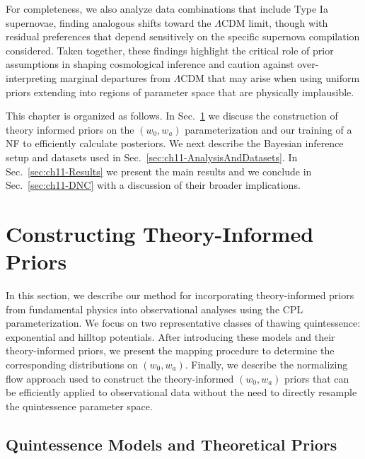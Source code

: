 For completeness, we also analyze data combinations that include Type Ia supernovae, finding analogous shifts toward the $\Lambda$CDM limit, though with residual preferences that depend sensitively on the specific supernova compilation considered. Taken together, these findings highlight the critical role of prior assumptions in shaping cosmological inference and caution against over-interpreting marginal departures from $\Lambda$CDM that may arise when using uniform priors extending into regions of parameter space that are physically implausible.

This chapter is organized as follows. In Sec.~\ref{sec:ch11-ConThInfPrior} we discuss the construction of theory informed priors on the $(w_0,w_a)$ parameterization and our training of a NF to efficiently calculate posteriors. We next describe the Bayesian inference setup and datasets used in Sec.~\ref{sec:ch11-AnalysisAndDatasets}. In Sec.~\ref{sec:ch11-Results} we present the main results and we conclude in Sec.~\ref{sec:ch11-DNC} with a discussion of their broader implications.

\section{Constructing Theory-Informed Priors}\label{sec:ch11-ConThInfPrior}

\noindent In this section, we describe our method for incorporating theory-informed priors from fundamental physics into observational analyses using the CPL parameterization. We focus on two representative classes of thawing quintessence: exponential and hilltop potentials. After introducing these models and their theory-informed priors, we present the mapping procedure to determine the corresponding distributions on $(w_0,w_a)$.  Finally, we describe the normalizing flow approach used to construct the theory-informed $(w_0,w_a)$ priors that can be efficiently applied to observational data without the need to directly resample the quintessence parameter space.

\subsection{Quintessence Models and Theoretical Priors}
\label{subsec:ch11-quintessence-models}

